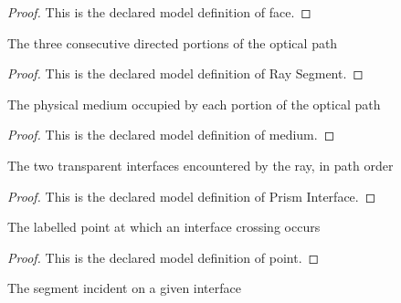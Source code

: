 \begin{proof}
  This is the declared model definition of face.
\end{proof}
\begin{definition}
  \label{def:physics:phyx-mini-0097:phyxminiproblems-problemphyxmini0097-raysegment}
  The three consecutive directed portions of the optical path
\end{definition}
\begin{proof}
  This is the declared model definition of Ray Segment.
\end{proof}
\begin{definition}[medium]
  \label{def:physics:phyx-mini-0097:phyxminiproblems-problemphyxmini0097-raysegment-medium}
  The physical medium occupied by each portion of the optical path
\end{definition}
\begin{proof}
  This is the declared model definition of medium.
\end{proof}
\begin{definition}
  \label{def:physics:phyx-mini-0097:phyxminiproblems-problemphyxmini0097-prisminterface}
  The two transparent interfaces encountered by the ray, in path order
\end{definition}
\begin{proof}
  This is the declared model definition of Prism Interface.
\end{proof}
\begin{definition}[point]
  \label{def:physics:phyx-mini-0097:phyxminiproblems-problemphyxmini0097-prisminterface-point}
  The labelled point at which an interface crossing occurs
\end{definition}
\begin{proof}
  This is the declared model definition of point.
\end{proof}
\begin{definition}
  \label{def:physics:phyx-mini-0097:phyxminiproblems-problemphyxmini0097-prisminterface-incidentsegment}
  The segment incident on a given interface
\end{definition}
